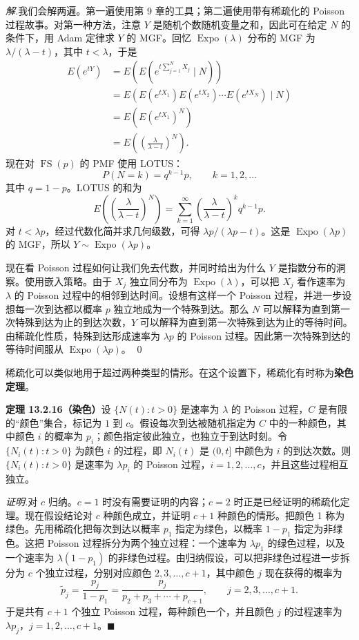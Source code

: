 \documentclass[UTF8,12pt,a4paper,fontset=fandol]{ctexart}
\begin{document}
\noindent\textit{解.}\quad 我们会解两遍。第一遍使用第 9 章的工具；第二遍使用带有稀疏化的 Poisson 过程故事。对第一种方法，注意 $Y$ 是随机个数随机变量之和，因此可在给定 $N$ 的条件下，用 Adam 定律求 $Y$ 的 MGF。回忆 $\operatorname{Expo}(\lambda)$ 分布的 MGF 为 $\lambda/(\lambda-t)$，其中 $t<\lambda$，于是
\[
\begin{aligned}
  E(e^{tY})
  &=E\left(E\left(e^{t\sum_{j=1}^{N}X_j}\mid N\right)\right)\\
  &=E\left(E(e^{tX_1})E(e^{tX_2})\cdots E(e^{tX_N})\mid N\right)\\
  &=E\left(E(e^{tX_1})^N\right)\\
  &=E\left(\left(\frac{\lambda}{\lambda-t}\right)^N\right).
\end{aligned}
\]
现在对 $\operatorname{FS}(p)$ 的 PMF 使用 LOTUS：
\[
  P(N=k)=q^{k-1}p,\qquad k=1,2,\ldots
\]
其中 $q=1-p$。LOTUS 的和为
\[
  E\left(\left(\frac{\lambda}{\lambda-t}\right)^N\right)
  =
  \sum_{k=1}^{\infty}
  \left(\frac{\lambda}{\lambda-t}\right)^kq^{k-1}p.
\]
对 $t<\lambda p$，经过代数化简并求几何级数，可得 $\lambda p/(\lambda p-t)$。这是 $\operatorname{Expo}(\lambda p)$ 的 MGF，所以 $Y\sim\operatorname{Expo}(\lambda p)$。

现在看 Poisson 过程如何让我们免去代数，并同时给出为什么 $Y$ 是指数分布的洞察。使用嵌入策略。由于 $X_j$ 独立同分布为 $\operatorname{Expo}(\lambda)$，可以把 $X_j$ 看作速率为 $\lambda$ 的 Poisson 过程中的相邻到达时间。设想有这样一个 Poisson 过程，并进一步设想每一次到达都以概率 $p$ 独立地成为一个特殊到达。那么 $N$ 可以解释为直到第一次特殊到达为止的到达次数，$Y$ 可以解释为直到第一次特殊到达为止的等待时间。由稀疏化性质，特殊到达形成速率为 $\lambda p$ 的 Poisson 过程。因此第一次特殊到达的等待时间服从 $\operatorname{Expo}(\lambda p)$。 \qed

稀疏化可以类似地用于超过两种类型的情形。在这个设置下，稀疏化有时称为\textbf{染色定理}。

\noindent\textbf{定理 13.2.16（染色）}\quad 设 $\{N(t):t>0\}$ 是速率为 $\lambda$ 的 Poisson 过程，$C$ 是有限的“颜色”集合，标记为 $1$ 到 $c$。假设每次到达被随机指定为 $C$ 中的一种颜色，其中颜色 $i$ 的概率为 $p_i$；颜色指定彼此独立，也独立于到达时刻。令 $\{N_i(t):t>0\}$ 为颜色 $i$ 的过程，即 $N_i(t)$ 是 $(0,t]$ 中颜色为 $i$ 的到达次数。则 $\{N_i(t):t>0\}$ 是速率为 $\lambda p_i$ 的 Poisson 过程，$i=1,2,\ldots,c$，并且这些过程相互独立。

\noindent\textit{证明.}\quad 对 $c$ 归纳。$c=1$ 时没有需要证明的内容；$c=2$ 时正是已经证明的稀疏化定理。现在假设结论对 $c$ 种颜色成立，并证明 $c+1$ 种颜色的情形。把颜色 1 称为绿色。先用稀疏化把每次到达以概率 $p_1$ 指定为绿色，以概率 $1-p_1$ 指定为非绿色。这把 Poisson 过程拆分为两个独立过程：一个速率为 $\lambda p_1$ 的绿色过程，以及一个速率为 $\lambda(1-p_1)$ 的非绿色过程。由归纳假设，可以把非绿色过程进一步拆分为 $c$ 个独立过程，分别对应颜色 $2,3,\ldots,c+1$，其中颜色 $j$ 现在获得的概率为
\[
  \tilde p_j=\frac{p_j}{1-p_1}
  =
  \frac{p_j}{p_2+p_3+\cdots+p_{c+1}},
  \qquad j=2,3,\ldots,c+1.
\]
于是共有 $c+1$ 个独立 Poisson 过程，每种颜色一个，并且颜色 $j$ 的过程速率为 $\lambda p_j$，$j=1,2,\ldots,c+1$。$\blacksquare$
\end{document}
